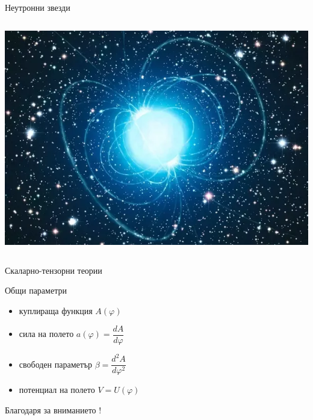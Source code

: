 \documentclass[10pt,a4paper]{beamer}
\begin{document}
        \begin{frame}{ Неутронни звезди }
            
                \begin{columns}
                    \begin{column}{0.8\textwidth}
                            \includegraphics[width=\textwidth]{images/neutron_star.png}
                    \end{column}
                \end{columns}
        \end{frame}
            
        \begin{frame}{ Скаларно-тензорни теории }
            \begin{block}{Общи параметри}
                \begin{itemize}
                    \item куплираща функция $ A(\varphi) $
                    \item сила на полето $ a(\varphi) = \dfrac{dA}{d\varphi} $
                    \item свободен параметър $ \beta = \dfrac{d^2A}{d\varphi^2} $
                    \item потенциал на полето $ V = U(\varphi) $
                \end{itemize}
            \end{block}
        \end{frame}
        
        
	\begin{frame}
		\begin{center}  {\Huge Благодаря за вниманието ! }\end{center}
	\end{frame}
	
\end{document}
